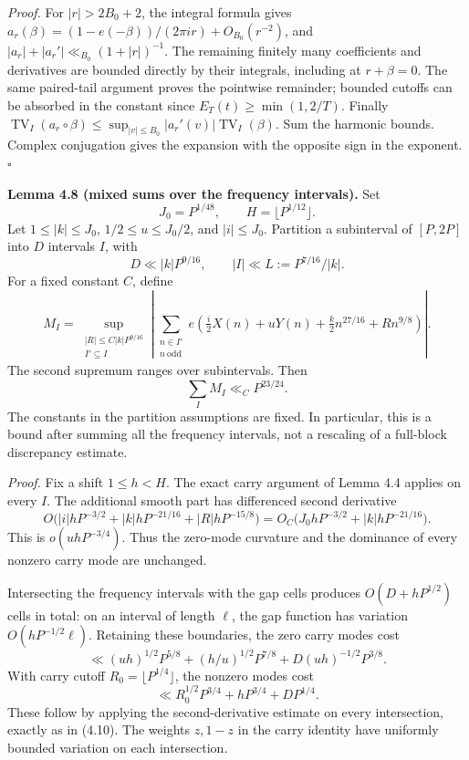 \documentclass[11pt,a4paper]{article}
\begin{document}
\emph{Proof.} For \(|r|>2B_0+2\), the integral formula gives
\(a_r(\beta)=(1-e(-\beta))/(2\pi i r)+O_{B_0}(r^{-2})\), and
\(|a_r|+|a_r'|\ll_{B_0}(1+|r|)^{-1}\). The remaining finitely many
coefficients and derivatives are bounded directly by their integrals,
including at \(r+\beta=0\). The same paired-tail argument proves the
pointwise remainder; bounded cutoffs can be absorbed in the constant
since \(E_T(t)\ge\min(1,2/T)\). Finally
\(\operatorname{TV}_I(a_r\circ\beta)
\le\sup_{|v|\le B_0}|a_r'(v)|\operatorname{TV}_I(\beta)\). Sum the
harmonic bounds. Complex conjugation gives the expansion with the
opposite sign in the exponent. \(\square\)


\textbf{Lemma 4.8 (mixed sums over the frequency intervals).} Set \[
J_0=P^{1/48},\qquad H=\lfloor P^{1/12}\rfloor .
\] Let \(1\le |k|\le J_0\), \(1/2\le u\le J_0/2\), and \(|i|\le J_0\).
Partition a subinterval of \([P,2P]\) into \(D\) intervals \(I\), with
\[
D\ll |k|P^{9/16},\qquad |I|\ll L:=P^{7/16}/|k|.
\] For a fixed constant \(C\), define \[
M_I=\sup_{\substack{|R|\le C|k|P^{9/16}\\ I'\subseteq I}}
\left|\sum_{\substack{n\in I'\\ n\ \mathrm{odd}}}
e\left(\tfrac i2X(n)+uY(n)+\tfrac k2 n^{27/16}+Rn^{9/8}\right)\right|.
\] The second supremum ranges over subintervals. Then \[
\sum_I M_I\ll_C P^{23/24}.
\tag{4.14}
\] The constants in the partition assumptions are fixed. In particular,
this is a bound after summing all the frequency intervals, not a
rescaling of a full-block discrepancy estimate.

\emph{Proof.} Fix a shift \(1\le h<H\). The exact carry argument of
Lemma 4.4 applies on every \(I\). The additional smooth part has
differenced second derivative \[
O\bigl(|i|hP^{-3/2}+|k|hP^{-21/16}
+|R|hP^{-15/8}\bigr)
=O_C\bigl(J_0hP^{-3/2}+|k|hP^{-21/16}\bigr).
\] This is \(o(uhP^{-3/4})\). Thus the zero-mode curvature and the
dominance of every nonzero carry mode are unchanged.

Intersecting the frequency intervals with the gap cells produces
\(O(D+hP^{1/2})\) cells in total: on an interval of length \(\ell\), the
gap function has variation \(O(hP^{-1/2}\ell)\). Retaining these
boundaries, the zero carry modes cost \[
\ll (uh)^{1/2}P^{5/8}
+(h/u)^{1/2}P^{7/8}
+D(uh)^{-1/2}P^{3/8}.
\] With carry cutoff \(R_0=\lfloor P^{1/4}\rfloor\), the nonzero modes
cost \[
\ll R_0^{1/2}P^{3/4}+hP^{3/4}+DP^{1/4}.
\] These follow by applying the second-derivative estimate on every
intersection, exactly as in (4.10). The weights \(z,1-z\) in the carry
identity have uniformly bounded variation on each intersection.
\end{document}
